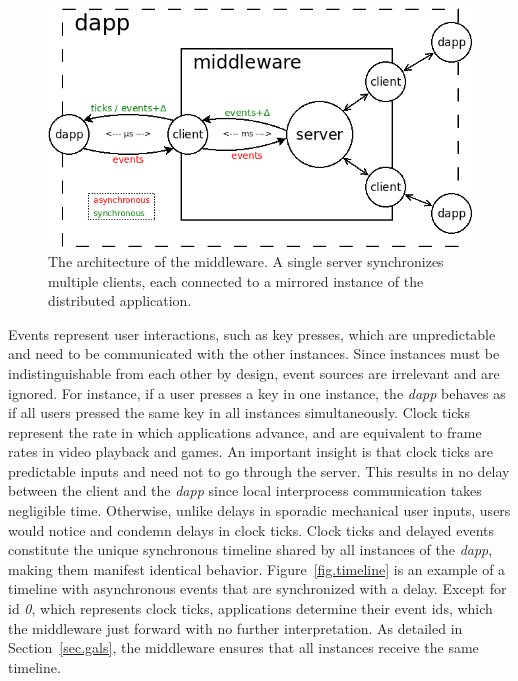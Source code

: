 \documentclass[sigplan,screen]{acmart}
\newcommand{\dapp}{\emph{dapp}\xspace}
\begin{document}
\begin{figure}[t]
  \centering
  \includegraphics[width=\linewidth]{middleware}
  \caption{
    \label{fig.middleware}
    The architecture of the middleware.
    A single server synchronizes multiple clients, each connected to a mirrored
    instance of the distributed application.
  }
\end{figure}

Events represent user interactions, such as key presses, which are
unpredictable and need to be communicated with the other instances.
Since instances must be indistinguishable from each other by design, event
sources are irrelevant and are ignored.
For instance, if a user presses a key in one instance, the \dapp behaves as if
all users pressed the same key in all instances simultaneously.
%
Clock ticks represent the rate in which applications advance, and are
equivalent to frame rates in video playback and games.
An important insight is that clock ticks are predictable inputs and need not to
go through the server.
This results in no delay between the client and the \dapp since local
interprocess communication takes negligible time.
Otherwise, unlike delays in sporadic mechanical user inputs, users would notice
and condemn delays in clock ticks.
%
Clock ticks and delayed events constitute the unique synchronous timeline
shared by all instances of the \dapp, making them manifest identical behavior.
Figure~\ref{fig.timeline} is an example of a timeline with asynchronous events
that are synchronized with a delay.
Except for id \emph{0}, which represents clock ticks, applications determine
their event ids, which the middleware just forward with no further
interpretation.
As detailed in Section~\ref{sec.gals}, the middleware ensures that all
instances receive the same timeline.
\end{document}
